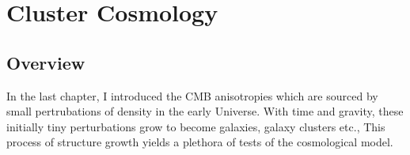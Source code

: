 \chapter{Cluster Cosmology}
\label{ch:clusters}
\section{Overview}
In the last chapter, I introduced the CMB anisotropies which are sourced by small pertrubations of density in the early Universe.
With time and gravity, these initially tiny perturbations grow to become galaxies, galaxy clusters etc.,
This process of structure growth yields a plethora of tests of the cosmological model.

